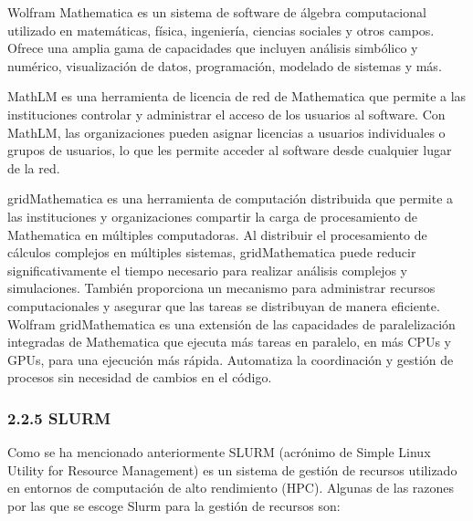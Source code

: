 \begin{doublespace}
\begin{multicols}{2}
    Wolfram Mathematica es un sistema de software de álgebra computacional utilizado en matemáticas, física, ingeniería, ciencias sociales y otros campos. Ofrece una amplia gama de capacidades que incluyen análisis simbólico y numérico, visualización de datos, programación, modelado de sistemas y más. \cite{Wolfram-mathematica-1}
    
    MathLM es una herramienta de licencia de red de Mathematica que permite a las instituciones controlar y administrar el acceso de los usuarios al software. Con MathLM, las organizaciones pueden asignar licencias a usuarios individuales o grupos de usuarios, lo que les permite acceder al software desde cualquier lugar de la red. \cite{Wolfram-mathlm-1}
    
    gridMathematica es una herramienta de computación distribuida que permite a las instituciones y organizaciones compartir la carga de procesamiento de Mathematica en múltiples computadoras. Al distribuir el procesamiento de cálculos complejos en múltiples sistemas, gridMathematica puede reducir significativamente el tiempo necesario para realizar análisis complejos y simulaciones. También proporciona un mecanismo para administrar recursos computacionales y asegurar que las tareas se distribuyan de manera eficiente. Wolfram gridMathematica es una extensión de las capacidades de paralelización integradas de Mathematica que ejecuta más tareas en paralelo, en más CPUs y GPUs, para una ejecución más rápida. Automatiza la coordinación y gestión de procesos sin necesidad de cambios en el código. \cite{Wolfram-grid-1}

    \subsubsection{2.2.5 SLURM}

    Como se ha mencionado anteriormente SLURM (acrónimo de Simple Linux Utility for Resource Management) es un sistema de gestión de recursos utilizado en entornos de computación de alto rendimiento (HPC). Algunas de las razones por las que se escoge Slurm para la gestión de recursos son:


\end{multicols}
\end{doublespace}
